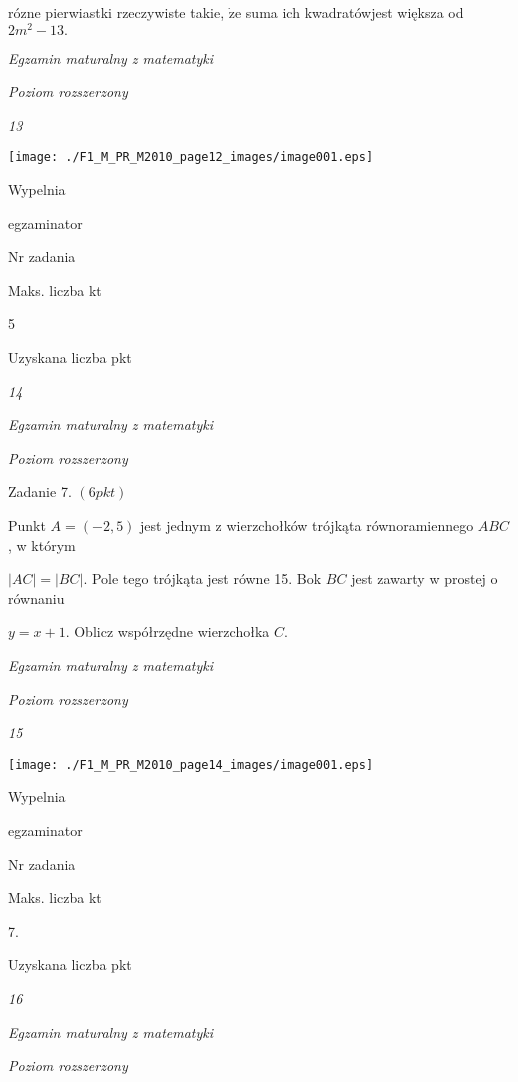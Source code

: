 \documentclass[a4paper,12pt]{article}
\begin{document}
rózne pierwiastki rzeczywiste takie, $\dot{\mathrm{z}}\mathrm{e}$ suma ich kwadratówjest większa od $2m^{2}-13.$





{\it Egzamin maturalny z matematyki}

{\it Poziom rozszerzony}

{\it 13}
\begin{center}
\texttt{[image: ./F1\_M\_PR\_M2010\_page12\_images/image001.eps]}
\end{center}
Wypelnia

egzaminator

Nr zadania

Maks. liczba kt

5

Uzyskana liczba pkt





{\it 14}

{\it Egzamin maturalny z matematyki}

{\it Poziom rozszerzony}

Zadanie 7. $(6pkt)$

Punkt $A=(-2,5)$ jest jednym z wierzchołków trójkąta równoramiennego $ABC$, w którym

$|AC|=|BC|$. Pole tego trójkąta jest równe 15. Bok $BC$ jest zawarty w prostej o równaniu

$y=x+1$. Oblicz współrzędne wierzchołka $C.$





{\it Egzamin maturalny z matematyki}

{\it Poziom rozszerzony}

{\it 15}
\begin{center}
\texttt{[image: ./F1\_M\_PR\_M2010\_page14\_images/image001.eps]}
\end{center}
Wypelnia

egzaminator

Nr zadania

Maks. liczba kt

7.

Uzyskana liczba pkt





{\it 16}

{\it Egzamin maturalny z matematyki}

{\it Poziom rozszerzony}
\end{document}

